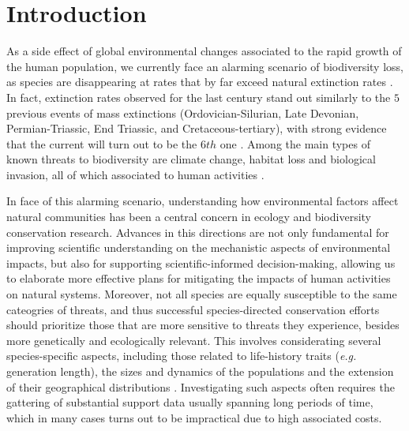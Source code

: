 \chapter{Introduction}\label{introduction}

As a side effect of global environmental changes associated to the rapid growth of the human population, we currently face an alarming scenario of biodiversity loss, as species are disappearing at rates that by far exceed natural extinction rates \cite{Ceballos2015}.
In fact, extinction rates observed for the last century stand out similarly to the $5$ previous events of mass extinctions (Ordovician-Silurian, Late Devonian, Permian-Triassic, End Triassic, and Cretaceous-tertiary), with strong evidence that the current will turn out to be the $6th$ one \cite{Wake2008}.
Among the main types of known threats to biodiversity are climate change, habitat loss and biological invasion, all of which associated to human activities \cite{Wilcove1998}.


In face of this alarming scenario, understanding how environmental factors affect natural communities has been a central concern in ecology and biodiversity conservation research. %
Advances in this directions are not only fundamental for improving scientific understanding on the mechanistic aspects of environmental impacts, but also for supporting scientific-informed decision-making, allowing us to elaborate more effective plans for mitigating the impacts of human activities on natural systems.
Moreover, not all species are equally susceptible to the same cateogries of threats, and thus successful species-directed conservation efforts should prioritize those that are more sensitive to threats they experience, besides more genetically and ecologically relevant.
This involves considerating several species-specific aspects, including those related to life-history traits (\textit{e.g.} generation length), the sizes and dynamics of the populations and the extension of their geographical distributions \cite{iucn_categ_crit}.
Investigating such aspects often requires the gattering of substantial support data usually spanning long periods of time, which in many cases turns out to be impractical due to high associated costs.

